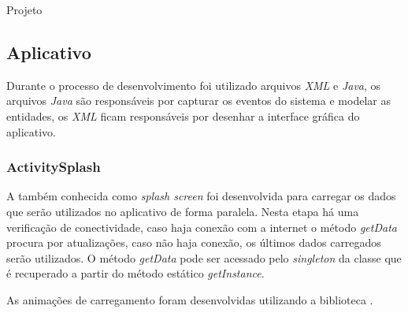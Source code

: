 \documentclass[
	12pt,				%
	openright,			%
	twoside,			%
	a4paper,			%
	english,			%
	french,				%
	spanish,			%
	brazil				%
	]{abntex2}
\begin{document}
\begin{chapter}{Projeto}
\subsection{Aplicativo}
Durante o processo de desenvolvimento foi utilizado arquivos \textit{XML} e \textit{Java}, os arquivos \textit{Java} são responsáveis por capturar os eventos do sistema e modelar as entidades, os \textit{XML} ficam responsáveis por desenhar a interface gráfica do aplicativo.

\subsubsection{ActivitySplash} \label{splash_activity}
A  também conhecida como \textit{splash screen} foi desenvolvida para carregar os dados que serão utilizados no aplicativo de forma paralela. Nesta etapa há uma verificação de conectividade, caso haja conexão com a internet o método \textit{getData} procura por atualizações, caso não haja conexão, os últimos dados carregados serão utilizados. O método \textit{getData} pode ser acessado pelo \textit{singleton} da classe  que é recuperado a partir do método estático \textit{getInstance}. 

As animações de carregamento foram desenvolvidas utilizando a biblioteca .


\end{chapter}
\end{document}
